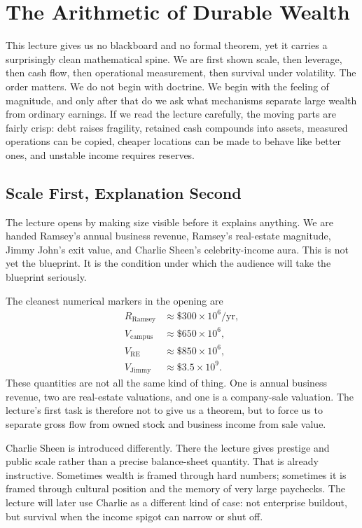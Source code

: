 \chapter{The Arithmetic of Durable Wealth}

This lecture gives us no blackboard and no formal theorem, yet it carries a surprisingly clean mathematical spine. We are first shown scale, then leverage, then cash flow, then operational measurement, then survival under volatility. The order matters. We do not begin with doctrine. We begin with the feeling of magnitude, and only after that do we ask what mechanisms separate large wealth from ordinary earnings. If we read the lecture carefully, the moving parts are fairly crisp: debt raises fragility, retained cash compounds into assets, measured operations can be copied, cheaper locations can be made to behave like better ones, and unstable income requires reserves.

\section{Scale First, Explanation Second}

The lecture opens by making size visible before it explains anything. We are handed Ramsey's annual business revenue, Ramsey's real-estate magnitude, Jimmy John's exit value, and Charlie Sheen's celebrity-income aura. This is not yet the blueprint. It is the condition under which the audience will take the blueprint seriously.

The cleanest numerical markers in the opening are
\begin{align}
R_{\mathrm{Ramsey}} &\approx \$300 \times 10^6/\text{yr},\\
V_{\mathrm{campus}} &\approx \$650 \times 10^6,\\
V_{\mathrm{RE}} &\approx \$850 \times 10^6,\\
V_{\mathrm{Jimmy}} &\approx \$3.5 \times 10^9.
\end{align}
These quantities are not all the same kind of thing. One is annual business revenue, two are real-estate valuations, and one is a company-sale valuation. The lecture's first task is therefore not to give us a theorem, but to force us to separate gross flow from owned stock and business income from sale value.

Charlie Sheen is introduced differently. There the lecture gives prestige and public scale rather than a precise balance-sheet quantity. That is already instructive. Sometimes wealth is framed through hard numbers; sometimes it is framed through cultural position and the memory of very large paychecks. The lecture will later use Charlie as a different kind of case: not enterprise buildout, but survival when the income spigot can narrow or shut off.


